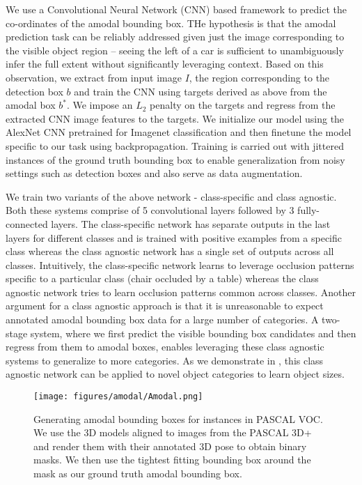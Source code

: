 We use a Convolutional Neural Network (CNN) \cite{neocognitron,LeCun1989} based framework to predict the co-ordinates of the amodal bounding box. THe hypothesis is that the amodal prediction task can be reliably addressed given just the image corresponding to the visible object region -- seeing the left of a car is sufficient to unambiguously infer the full extent without significantly leveraging context. Based on this observation, we extract from input image $I$, the region corresponding to the detection box $b$ and train the CNN using targets derived as above from the amodal box $b^*$. We impose an $L_2$ penalty on the targets and regress from the extracted CNN image features to the targets. We initialize our model using the AlexNet \cite{krizhevsky2012imagenet} CNN pretrained for Imagenet \cite{imagenet_cvpr09} classification and then finetune the model specific to our task using backpropagation. Training is carried out with jittered instances of the ground truth bounding box to enable generalization from noisy settings such as detection boxes and also serve as data augmentation.

We train two variants of the above network - class-specific and class agnostic. Both these systems comprise of 5 convolutional layers followed by 3 fully-connected layers. The class-specific network has separate outputs in the last layers for different classes and is trained with positive examples from a specific class whereas the class agnostic network has a single set of outputs across all classes. Intuitively, the class-specific network learns to leverage occlusion patterns specific to a particular class (\eg chair occluded by a table) whereas the class agnostic network tries to learn occlusion patterns common across classes. Another argument for a class agnostic approach is that it is unreasonable to expect annotated amodal bounding box data for a large number of categories. A two-stage system, where we first predict the visible bounding box candidates and then regress from them to amodal boxes, enables leveraging these class agnostic systems to generalize to more categories. As we demonstrate in , this class agnostic network can be applied to novel object categories to learn object sizes.

\begin{figure}
  \centering
  \texttt{[image: figures/amodal/Amodal.png]}
  \caption{ Generating amodal bounding boxes for instances in PASCAL VOC. We use the 3D models aligned to images from the PASCAL 3D+ \cite{pascal3d} and render them with their annotated 3D pose to obtain binary masks. We then use the tightest fitting bounding box around the mask as our ground truth amodal bounding box.}
\end{figure}

